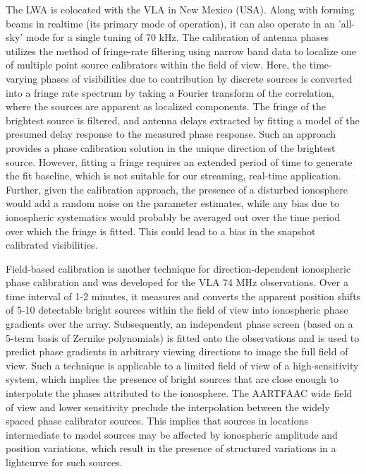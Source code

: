 \documentclass[referee]{aa}
\begin{document}
The  LWA  \citep{ellingsonLWA1}  is  colocated  with  the  VLA  in  New  Mexico
(USA). Along with forming beams in realtime (its primary mode of operation), it
can  also operate  in an  'all-sky' mode  for a  single tuning  of 70  kHz.  The
calibration of antenna phases utilizes the method of fringe-rate filtering using
narrow band data to localize one of multiple point source calibrators within the
field of view. Here, the time-varying phases of visibilities due to contribution
by discrete sources is converted into a fringe rate spectrum by taking a Fourier
transform  of the  correlation,  where  the sources  are  apparent as  localized
components. The fringe  of the brightest source is  filtered, and antenna delays
extracted by  fitting a  model of  the presumed delay  response to  the measured
phase response.  Such  an approach provides a phase  calibration solution in the
unique direction of the brightest source.  However, fitting a fringe requires an
extended period of time to generate  the fit baseline, which is not suitable for
our streaming, real-time application.   Further, given the calibration approach,
the presence of a disturbed ionosphere would add a random noise on the parameter
estimates,  while any  bias due  to  ionospheric systematics  would probably  be
averaged out  over the time period over  which the fringe is  fitted. This could
lead to a bias in the snapshot calibrated visibilities.

Field-based  calibration  \citep{cottona2004beyond}  is  another  technique  for
direction-dependent ionospheric phase calibration  and was developed for the VLA
74  MHz observations.   Over a  time interval  of 1-2  minutes, it  measures and
converts the apparent  position shifts of 5-10 detectable  bright sources within
the field of view into ionospheric phase gradients over the array. Subsequently,
an independent phase screen (based on  a 5-term basis of Zernike polynomials) is
fitted onto the observations and is used to predict phase gradients in arbitrary
viewing  directions to  image  the full  field  of view.   Such  a technique  is
applicable  to a  limited  field of  view  of a  high-sensitivity system,  which
implies the presence of bright sources  that are close enough to interpolate the
phases attributed to  the ionosphere. The AARTFAAC wide field  of view and lower
sensitivity  preclude   the  interpolation  between  the   widely  spaced  phase
calibrator  sources.  This  implies that  sources in  locations  intermediate to
model sources may be affected  by ionospheric amplitude and position variations,
which result in  the presence of structured variations in  a lightcurve for such
sources. %
\end{document}
